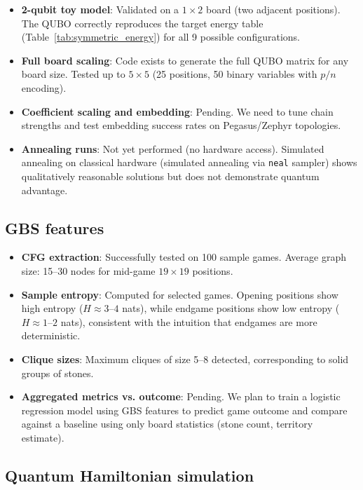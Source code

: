 \documentclass[aps,prl,reprint]{revtex4-2}
\begin{document}
\begin{itemize}
	\item \textbf{2-qubit toy model}: Validated on a $1 \times 2$ board (two adjacent positions). The QUBO correctly reproduces the target energy table (Table~\ref{tab:symmetric_energy}) for all 9 possible configurations.
	\item \textbf{Full board scaling}: Code exists to generate the full QUBO matrix for any board size. Tested up to $5 \times 5$ (25 positions, 50 binary variables with $p/n$ encoding).
	\item \textbf{Coefficient scaling and embedding}: Pending. We need to tune chain strengths and test embedding success rates on Pegasus/Zephyr topologies.
	\item \textbf{Annealing runs}: Not yet performed (no hardware access). Simulated annealing on classical hardware (simulated annealing via \texttt{neal} sampler) shows qualitatively reasonable solutions but does not demonstrate quantum advantage.
\end{itemize}

\subsection{GBS features}

\begin{itemize}
	\item \textbf{CFG extraction}: Successfully tested on 100 sample games. Average graph size: 15--30 nodes for mid-game $19 \times 19$ positions.
	\item \textbf{Sample entropy}: Computed for selected games. Opening positions show high entropy ($H \approx 3$--$4$ nats), while endgame positions show low entropy ($H \approx 1$--$2$ nats), consistent with the intuition that endgames are more deterministic.
	\item \textbf{Clique sizes}: Maximum cliques of size 5--8 detected, corresponding to solid groups of stones.
	\item \textbf{Aggregated metrics vs. outcome}: Pending. We plan to train a logistic regression model using GBS features to predict game outcome and compare against a baseline using only board statistics (stone count, territory estimate).
\end{itemize}

\subsection{Quantum Hamiltonian simulation}
\end{document}
